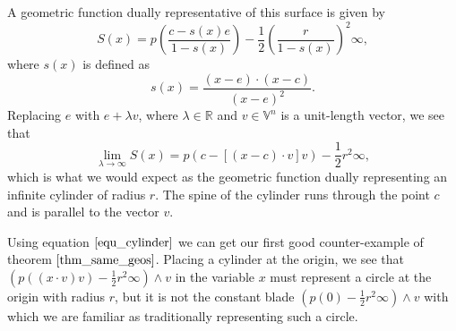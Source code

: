 \documentclass[12pt]{article}
\newcommand{\V}{\mathbb{V}}
\newcommand{\R}{\mathbb{R}}
\newcommand{\nvai}{\infty}
\begin{document}
A geometric function dually representative of this surface is given by
\begin{equation*}
S(x) = p\left(\frac{c-s(x)e}{1-s(x)}\right)-\frac{1}{2}\left(\frac{r}{1-s(x)}\right)^2\nvai,
\end{equation*}
where $s(x)$ is defined as
\begin{equation*}
s(x) = \frac{(x-e)\cdot(x-c)}{(x-e)^2}.
\end{equation*}
Replacing $e$ with $e+\lambda v$, where $\lambda\in\R$ and $v\in\V^n$ is a unit-length vector,
we see that
\begin{equation}\label{equ_cylinder}
\lim_{\lambda\to\infty} S(x) = p(c-[(x-c)\cdot v]v)-\frac{1}{2}r^2\nvai,
\end{equation}
which is what we would expect as the geometric function dually representing an infinite cylinder
of radius $r$.  The spine of the cylinder runs through the point $c$ and is parallel
to the vector $v$.

Using equation $\eqref{equ_cylinder}$ we can get our first good counter-example
of theorem $\eqref{thm_same_geos}$.  Placing a cylinder at the origin, we
see that $(p((x\cdot v)v)-\frac{1}{2}r^2\nvai)\wedge v$ in the variable
$x$ must represent a circle at the origin with radius $r$, but it is not the constant blade
$(p(0)-\frac{1}{2}r^2\nvai)\wedge v$ with which we are familiar as traditionally representing
such a circle.
\end{document}
